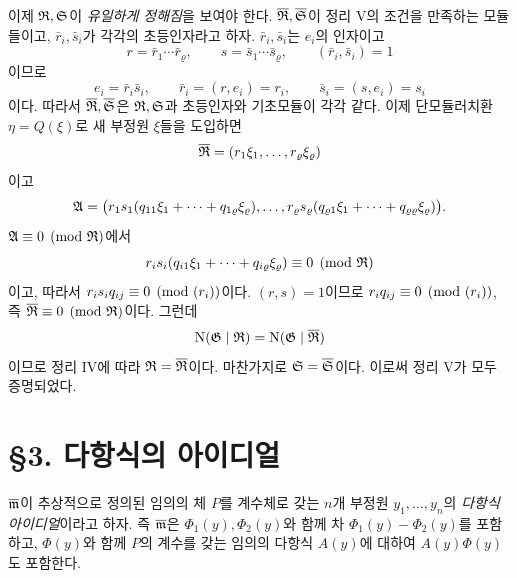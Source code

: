 이제 \(\mathfrak R,\mathfrak S\)이 \emph{유일하게 정해짐}을 보여야 한다. \(\overline{\mathfrak R},\overline{\mathfrak S}\)이 정리 V의 조건을 만족하는 모듈들이고, \(\bar r_i,\bar s_i\)가 각각의 초등인자라고 하자. \(\bar r_i,\bar s_i\)는 \(e_i\)의 인자이고
\[
r=\bar r_1\cdots\bar r_\varrho,\qquad
s=\bar s_1\cdots\bar s_\varrho,\qquad
(\bar r_i,\bar s_i)=1
\]
이므로
\[
e_i=\bar r_i\bar s_i,\qquad
\bar r_i=(r,e_i)=r_i,\qquad
\bar s_i=(s,e_i)=s_i
\]
이다. 따라서 \(\overline{\mathfrak R},\overline{\mathfrak S}\)은 \(\mathfrak R,\mathfrak S\)과 초등인자와 기초모듈이 각각 같다. 이제 단모듈러치환 \(\eta=Q(\xi)\)로 새 부정원 \(\xi\)들을 도입하면
\[
\overline{\mathfrak R}=(r_1\xi_1,\ldots,r_\varrho\xi_\varrho)
\]
이고
\[
\mathfrak A=\bigl(
r_1s_1(q_{11}\xi_1+\cdots+q_{1\varrho}\xi_\varrho),\ldots,
r_\varrho s_\varrho(q_{\varrho1}\xi_1+\cdots+q_{\varrho\varrho}\xi_\varrho)
\bigr).
\]
\(\mathfrak A\equiv0\pmod{\mathfrak R}\)에서
\[
r_is_i(q_{i1}\xi_1+\cdots+q_{i\varrho}\xi_\varrho)\equiv0\pmod{\mathfrak R}
\]
이고, 따라서 \(r_is_iq_{ij}\equiv0\pmod{(r_i)}\)이다. \((r,s)=1\)이므로 \(r_iq_{ij}\equiv0\pmod{(r_i)}\), 즉 \(\overline{\mathfrak R}\equiv0\pmod{\mathfrak R}\)이다. 그런데
\[
\operatorname N(\mathfrak G\mid\mathfrak R)=\operatorname N(\mathfrak G\mid\overline{\mathfrak R})
\]
이므로 정리 IV에 따라 \(\mathfrak R=\overline{\mathfrak R}\)이다. 마찬가지로 \(\mathfrak S=\overline{\mathfrak S}\)이다. 이로써 정리 V가 모두 증명되었다.

\section*{\S{}3. 다항식의 아이디얼}

\(\overline{\mathfrak m}\)이 추상적으로 정의된 임의의 체 \(P\)를 계수체로 갖는 \(n\)개 부정원 \(y_1,\ldots,y_n\)의 \emph{다항식 아이디얼}이라고 하자. 즉 \(\overline{\mathfrak m}\)은 \(\Phi_1(y),\Phi_2(y)\)와 함께 차 \(\Phi_1(y)-\Phi_2(y)\)를 포함하고, \(\Phi(y)\)와 함께 \(P\)의 계수를 갖는 임의의 다항식 \(A(y)\)에 대하여 \(A(y)\Phi(y)\)도 포함한다.

